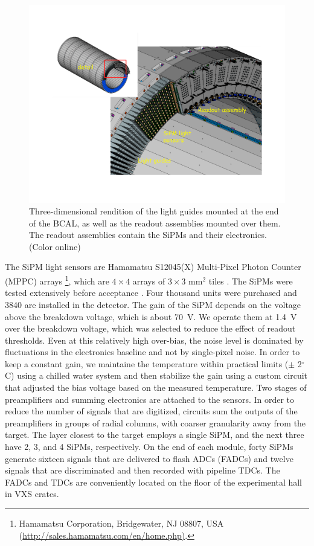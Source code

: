 \begin{figure}[tbp]\centering
\includegraphics[scale=0.4]{figures/bcal_assemblies.pdf}
\caption{\label{fig:bcal:bcal_assemblies}
   Three-dimensional rendition of the light guides mounted at the end of the 
   BCAL, as well as the readout assemblies mounted over them. The 
   readout assemblies contain the 
   SiPMs and their electronics.  (Color online)
  }
\end{figure}


The SiPM light sensors are Hamamatsu S12045(X) Multi-Pixel Photon Counter (MPPC) arrays \footnote{Hamamatsu Corporation, Bridgewater, NJ 08807, USA \\ (\url{http://sales.hamamatsu.com/en/home.php)}.}, 
which are $4\times4$ arrays of $3\times3$ mm$^2$ tiles \cite{hdnote2913}. The SiPMs were tested extensively before acceptance \cite{Barbosa2012100,Qiang2013234,soto,Soto201489,BeattieIEEE,doi:10.1063/1.4955340}. Four thousand units were purchased and 3840 are installed in the detector. The gain of the SiPM depends on the voltage above the breakdown voltage, which is about 70~V. We operate them at 1.4~V over the breakdown voltage, which was selected to reduce the effect of readout thresholds. Even at this relatively high over-bias, the noise level is dominated by fluctuations in the electronics baseline and not by single-pixel noise. In order to keep a constant gain, we maintaine the temperature within practical limits ($\pm$ 2$^\circ$C) using a chilled water system and then stabilize the gain using a custom circuit that adjusted the bias voltage based on the measured temperature. Two stages of preamplifiers and summing electronics are attached to the sensors. In order to reduce the number of signals that are digitized, circuits sum the outputs of the preamplifiers in groups of radial columns, with coarser granularity away from the target. The layer closest to the target employs a single SiPM, and the next three have 2, 3, and 4 SiPMs, respectively. On the end of each module, forty SiPMs generate sixteen signals that are delivered to flash ADCs (FADCs) and twelve signals that are discriminated and then recorded with pipeline TDCs. The FADCs and TDCs are conveniently located on the floor of the experimental hall in VXS crates.

